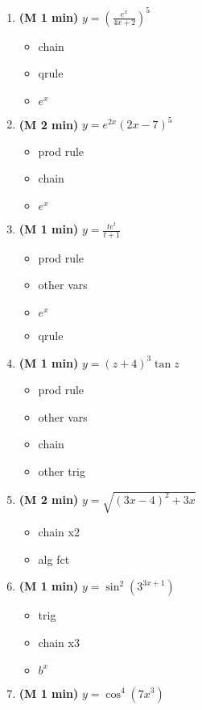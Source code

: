 \documentclass[12pt]{article}
\begin{document}
\begin{enumerate}[1.]
\begin{enumerate}
	\item {\bf (M 1 min)} $y=\left(\displaystyle\frac{e^x}{4x+2}\right)^5$
	{\bf\begin{itemize}
\item chain
\item qrule
\item $e^x$
\end{itemize}}
	\item {\bf (M 2 min)} $y=e^{2x}(2x-7)^5$
	{\bf\begin{itemize}
\item prod rule
\item chain
\item $e^x$
\end{itemize}}
	\item {\bf (M 1 min)} $y=\displaystyle\frac{te^t}{t+1}$
	{\bf\begin{itemize}
\item prod rule
\item other vars
\item $e^x$
\item qrule
\end{itemize}}
	\item {\bf (M 1 min)} $y=(z+4)^3\tan z$
	{\bf\begin{itemize}
\item prod rule
\item other vars
\item chain
\item other trig
\end{itemize}}
	\item {\bf (M 2 min)} $y=\sqrt{(3x-4)^2+3x}$
	{\bf\begin{itemize}
\item chain x2
\item alg fct
\end{itemize}}
	\item {\bf (M 1 min)} $y=\sin^2{(3^{3x+1})}$
	{\bf\begin{itemize}
\item trig
\item chain x3
\item $b^x$
\end{itemize}}
	\item {\bf (M 1 min)} $y=\cos^4{(7x^3)}$

\end{enumerate}
\end{enumerate}
\end{document}
